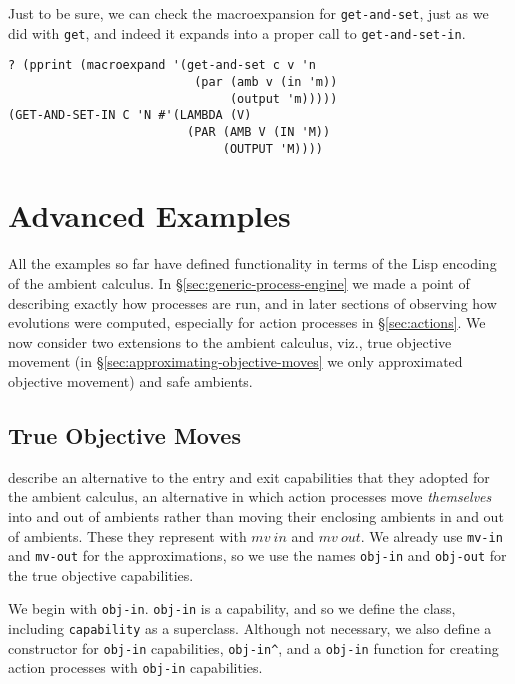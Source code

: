 \documentclass[12pt]{article}
\begin{document}
Just to be sure, we can check the macroexpansion for \texttt{get-and-set}, just as we did with \texttt{get}, and indeed it expands into a proper call to \texttt{get-and-set-in}.

\begin{verbatim}
? (pprint (macroexpand '(get-and-set c v 'n
                          (par (amb v (in 'm))
                               (output 'm)))))
(GET-AND-SET-IN C 'N #'(LAMBDA (V)
                         (PAR (AMB V (IN 'M))
                              (OUTPUT 'M))))
\end{verbatim}

\section{Advanced Examples}
\label{sec:advanced-examples}

All the examples so far have defined functionality in terms of the Lisp encoding of the ambient calculus.
In \S\ref{sec:generic-process-engine} we made a point of describing exactly how processes are run, and in later sections of observing how evolutions were computed, especially for action processes in \S\ref{sec:actions}.
We now consider two extensions to the ambient calculus, viz., true objective movement (in \S\ref{sec:approximating-objective-moves} we only approximated objective movement) and safe ambients.

\subsection{True Objective Moves}
\label{sec:true-objective-moves}

 describe an alternative to the entry and exit capabilities that they adopted for the ambient calculus, an alternative in which action processes move \emph{themselves} into and out of ambients rather than moving their enclosing ambients in and out of ambients.
These they represent with $\mathit{mv\ in}$ and $\mathit{mv\ out}$.
We already use \texttt{mv-in} and \texttt{mv-out} for the approximations, so we use the names \texttt{obj-in} and \texttt{obj-out} for the true objective capabilities.

We begin with \texttt{obj-in}.
\texttt{obj-in} is a capability, and so we define the class, including \texttt{capability} as a superclass.
Although not necessary, we also define a constructor for \texttt{obj-in} capabilities, \texttt{obj-in\^}, and a \texttt{obj-in} function for creating action processes with \texttt{obj-in} capabilities.
\end{document}
